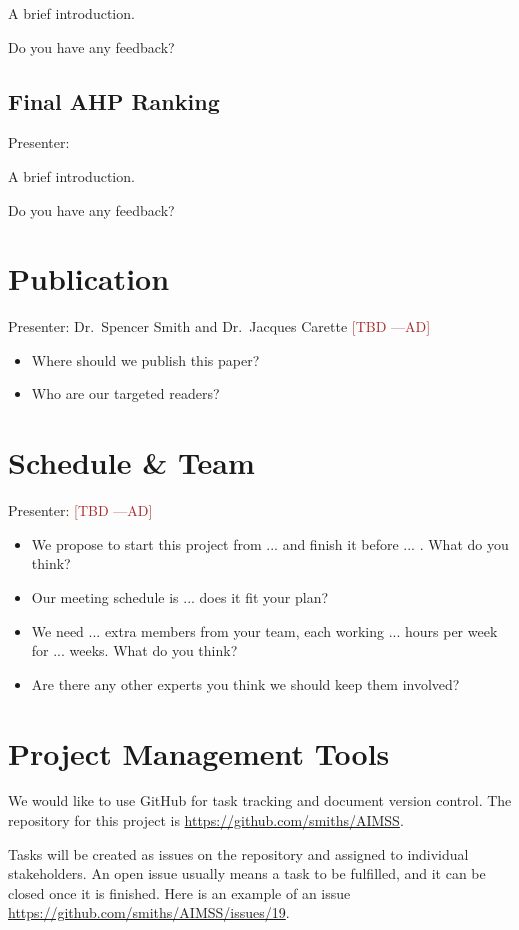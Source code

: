 \documentclass[12pt]{article}
\newcommand{\authornote}[3]{\textcolor{#1}{[#3 ---#2]}}
\newcommand{\authornote}[3]{}
\newcommand{\ad}[1]{\authornote{brown}{AD}{#1}} %
\begin{document}
A brief introduction. 

Do you have any feedback?

\subsection{Final AHP Ranking}
\label{final_AHP}
Presenter:

A brief introduction. 

Do you have any feedback?

\section{Publication}
Presenter: Dr.\ Spencer Smith and Dr.\ Jacques Carette \ad{TBD}

\begin{itemize}
\item Where should we publish this paper?
\item Who are our targeted readers?
\end{itemize}

\section{Schedule \& Team}
Presenter: \ad{TBD}

\begin{itemize}
\item We propose to start this project from ... and finish it before ... . What
do you think?
\item Our meeting schedule is ... does it fit your plan?
\item We need ... extra members from your team, each working ... hours per week
for ... weeks. What do you think?
\item Are there any other experts you think we should keep them involved?
\end{itemize}

\appendix
\section{Project Management Tools}
\label{proj_mgmt_tools}
We would like to use GitHub for task tracking and document version control. The
repository for this project is
\href{https://github.com/smiths/AIMSS}{https://github.com/smiths/AIMSS}.

Tasks will be created as issues on the repository and assigned to individual
stakeholders. An open issue usually means a task to be fulfilled, and it can be
closed once it is finished. Here is an example of an issue
\href{https://github.com/smiths/AIMSS/issues/19}{https://github.com/smiths/AIMSS/issues/19}.
\end{document}
